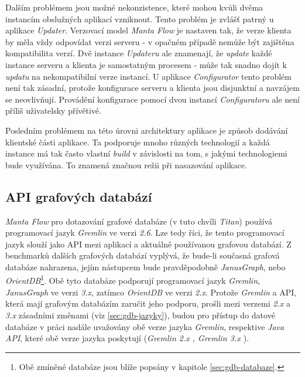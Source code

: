 Dalším problémem jsou možné nekonzistence, které mohou kvůli dvěma instancím obslužných aplikací vzniknout. Tento problém je zvlášť patrný u aplikace \textit{Updater}. Verzovací model \textit{Manta Flow} je nastaven tak, že verze klienta by měla vždy odpovídat verzi serveru - v opačném případě nemůže být zajištěna kompatibilita verzí. Dvě instance \textit{Updateru} ale znamenají, že \textit{update} každé instance serveru a klienta je samostatným procesem - může tak snadno dojít k \textit{updatu} na nekompatibilní verze instancí. U aplikace \textit{Configurator} tento problém není tak zásadní, protože konfigurace serveru a klienta jsou disjunktní a navzájem se neovlivňují. Provádění konfigurace pomocí dvou instancí \textit{Configuratoru} ale není příliš uživatelsky přívětivé.

Posledním problémem na této úrovni architektury aplikace je způsob dodávání klientské části aplikace. Ta podporuje mnoho různých technologií a každá instance má tak často vlastní \textit{build} v závislosti na tom, s jakými technologiemi bude využívána. To znamená značnou režii při nasazování aplikace.

\subsection{API grafových databází}
\label{sec:ana_gdbapi}
\textit{Manta Flow} pro dotazování grafové databáze (v tuto chvíli \textit{Titan}) používá programovací jazyk \textit{Gremlin} ve verzi \textit{2.6}. Lze tedy říci, že tento programovací jazyk slouží jako API mezi aplikací a aktuálně používanou grafovou databází. Z benchmarků dalších grafových databází \cite{Kovar18} vyplývá, že bude-li současná grafová databáze nahrazena, jejím nástupcem bude pravděpodobně \textit{JanusGraph}, nebo \textit{OrientDB}\footnote{Obě zmíněné databáze jsou blíže popsány v kapitole \ref{sec:gdb-databaze}.}. Obě tyto databáze podporují programovací jazyk \textit{Gremlin}, \textit{JanusGraph} ve verzi \textit{3.x}, zatímco \textit{OrientDB} ve verzi \textit{2.x}.
Protože \textit{Gremlin} a API, která mají grafovým databázím zaručit jeho podporu, prošli mezi verzemi \textit{2.x} a \textit{3.x} zásadními změnami (viz \ref{sec:gdb-jazyky}), budou pro přístup do datové databáze v práci nadále uvažovány obě verze jazyka \textit{Gremlin}, respektive \textit{Java API}, které obě verze jazyka poskytují (\textit{Gremlin 2.x \cite{Gremlin14}, Gremlin 3.x \cite{Gremlin17}}).

